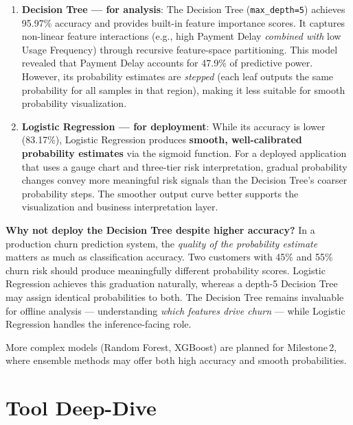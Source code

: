 \documentclass[12pt, a4paper]{article}
\begin{document}
\begin{enumerate}
    \item \textbf{Decision Tree --- for analysis}: The Decision Tree (\texttt{max\_depth=5}) achieves 95.97\% accuracy and provides built-in feature importance scores. It captures non-linear feature interactions (e.g., high Payment Delay \textit{combined with} low Usage Frequency) through recursive feature-space partitioning. This model revealed that Payment Delay accounts for 47.9\% of predictive power. However, its probability estimates are \textit{stepped} (each leaf outputs the same probability for all samples in that region), making it less suitable for smooth probability visualization.

    \item \textbf{Logistic Regression --- for deployment}: While its accuracy is lower (83.17\%), Logistic Regression produces \textbf{smooth, well-calibrated probability estimates} via the sigmoid function. For a deployed application that uses a gauge chart and three-tier risk interpretation, gradual probability changes convey more meaningful risk signals than the Decision Tree's coarser probability steps. The smoother output curve better supports the visualization and business interpretation layer.
\end{enumerate}

\textbf{Why not deploy the Decision Tree despite higher accuracy?} In a production churn prediction system, the \textit{quality of the probability estimate} matters as much as classification accuracy. Two customers with 45\% and 55\% churn risk should produce meaningfully different probability scores. Logistic Regression achieves this graduation naturally, whereas a depth-5 Decision Tree may assign identical probabilities to both. The Decision Tree remains invaluable for offline analysis --- understanding \textit{which features drive churn} --- while Logistic Regression handles the inference-facing role.

More complex models (Random Forest, XGBoost) are planned for Milestone\,2, where ensemble methods may offer both high accuracy and smooth probabilities.

\section{Tool Deep-Dive}
\end{document}

